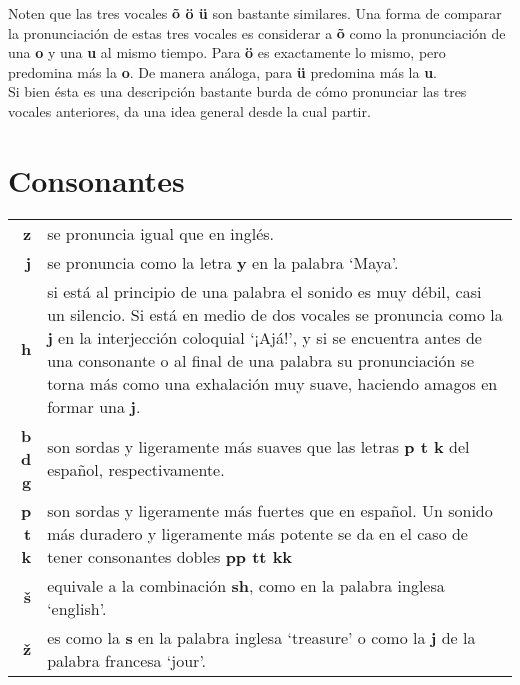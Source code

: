 \begin{enumerate}
	Noten que las tres vocales \foreignlanguage{estonian}{\textbf{õ ö ü}} son bastante similares. Una forma de comparar la pronunciación de estas tres vocales es considerar a \foreignlanguage{estonian}{\textbf{õ}} como la pronunciación de una \textbf{o} y una \textbf{u} al mismo tiempo. Para \foreignlanguage{estonian}{\textbf{ö}} es exactamente lo mismo, pero predomina más la \textbf{o}. De manera análoga, para \foreignlanguage{estonian}{\textbf{ü}} predomina más la \textbf{u}.\\

	Si bien ésta es una descripción bastante burda de cómo pronunciar las tres vocales anteriores, da una idea general desde la cual partir.

 	\section*{\Large{Consonantes}}

 	\begin{tabular}{ r p{9cm} }

 	\textbf{z} & se pronuncia igual que en inglés.\\[0.5cm]

 	\textbf{j} & se pronuncia como la letra \textbf{y} en la palabra `Maya'.\\[0.5cm] 

 	\textbf{h} & si está al principio de una palabra el sonido es muy débil, casi un silencio. Si está en medio de dos vocales se pronuncia como la \textbf{j} en la interjección coloquial `¡Ajá!', y si se encuentra antes de una consonante o al final de una palabra su pronunciación se torna más como una exhalación muy suave, haciendo amagos en formar una \textbf{j}.\\[0.5cm]

 	\textbf{b d g} & son sordas y ligeramente más suaves que las letras \textbf{p t k} del español, respectivamente.\\[0.5cm]

 	\textbf{p t k} & son sordas y ligeramente más fuertes que en español. Un sonido más duradero y ligeramente más potente se da en el caso de tener consonantes dobles \textbf{pp tt kk}\\[0.5cm]  

 	\foreignlanguage{estonian}{\textbf{š}} & equivale a la combinación \textbf{sh}, como en la palabra inglesa `english'.\\[0.5cm]

 	\foreignlanguage{estonian}{\textbf{ž}} & es como la \textbf{s} en la palabra inglesa `treasure' o como la \textbf{j} de la palabra francesa `jour'.


\end{tabular}
\end{enumerate}
